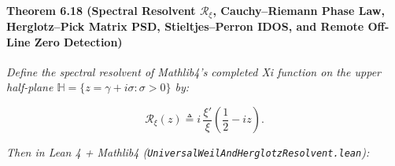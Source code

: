 \documentclass[
  11pt,
]{article}
\begin{document}
\paragraph{\texorpdfstring{Theorem 6.18 (Spectral Resolvent
\(\mathcal{R}_\xi\), Cauchy--Riemann Phase Law, Herglotz--Pick Matrix
PSD, Stieltjes--Perron IDOS, and Remote Off-Line Zero
Detection)}{Theorem 6.18 (Spectral Resolvent \textbackslash mathcal\{R\}\_\textbackslash xi, Cauchy--Riemann Phase Law, Herglotz--Pick Matrix PSD, Stieltjes--Perron IDOS, and Remote Off-Line Zero Detection)}}\label{theorem-6.18-spectral-resolvent-mathcalr_xi-cauchyriemann-phase-law-herglotzpick-matrix-psd-stieltjesperron-idos-and-remote-off-line-zero-detection}

\emph{Define the spectral resolvent of Mathlib4's completed Xi function
on the upper half-plane
\(\mathbb{H} = \{z = \gamma + i\sigma : \sigma > 0\}\) by:}

\[\mathcal{R}_\xi(z) \triangleq i\,\frac{\xi'}{\xi}\!\left(\frac{1}{2} - i z\right).\]

\emph{Then in Lean 4 + Mathlib4
(\texttt{UniversalWeilAndHerglotzResolvent.lean}):}
\end{document}

